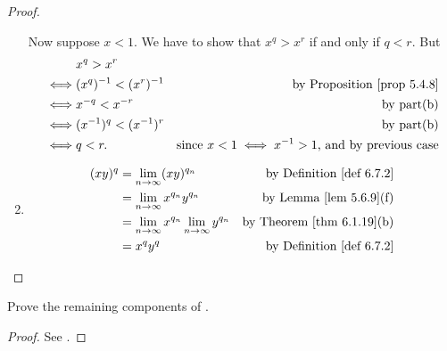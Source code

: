 \begin{proof}
\begin{enumerate}
    Now suppose \(x < 1\).
    We have to show that \(x^q > x^r\) if and only if \(q < r\).
    But
    \begin{align*}
             & x^q > x^r \\
        \iff & (x^q)^{-1} < (x^r)^{-1} & \text{by \PROP{5.4.8}} \\
        \iff & x^{-q} < x^{-r} & \text{by part(b)} \\
        \iff & (x^{-1})^q < (x^{-1})^r & \text{by part(b)} \\
        \iff & q < r. & \text{since \(x < 1 \iff x^{-1} > 1\), and by previous case}
    \end{align*}
\item
    \begin{align*}
        (xy)^q & = \lim_{n \toINF} (xy)^{q_n} & \text{by \DEF{6.7.2}} \\
               & = \lim_{n \toINF} x^{q_n} y^{q_n} & \text{by \LEM{5.6.9}(f)} \\
               & = \lim_{n \toINF} x^{q_n} \lim_{n \toINF} y^{q_n} & \text{by \THM{6.1.19}(b)} \\
               & = x^q y^q & \text{by \DEF{6.7.2}}
    \end{align*}
\end{enumerate}
\end{proof}

\exercisesection

\begin{exercise} \label{exercise 6.7.1}
Prove the remaining components of .
\end{exercise}

\begin{proof}
See .
\end{proof}